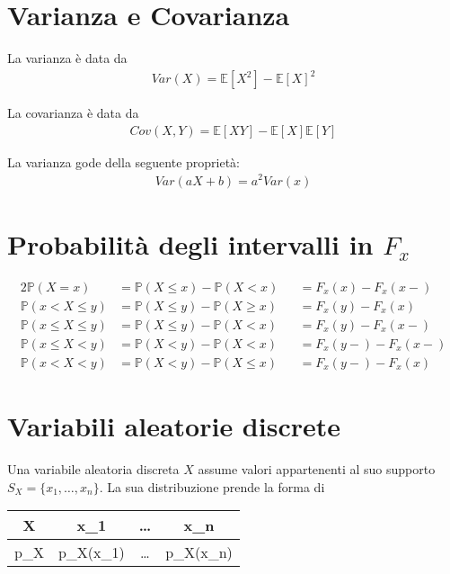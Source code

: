 \documentclass{article}
\begin{document}
\section{Varianza e Covarianza}

La varianza \`e data da
\begin{align*}
Var(X) = \mathbb{E}[X^2] - \mathbb{E}[X]^2
\end{align*}

La covarianza \`e data da
\begin{align*}
Cov(X, Y) = \mathbb{E}[XY] - \mathbb{E}[X]\mathbb{E}[Y]
\end{align*}

La varianza gode della seguente propriet\`a:
\begin{align*}
Var(aX+b) = a^2 Var(x)
\end{align*}

\section{Probabilit\`a degli intervalli in $F_x$}

\begin{alignat*}{2}
\mathbb{P}(X = x) &= \mathbb{P}(X \leq x) - \mathbb{P}(X < x) &&= F_x(x) - F_x(x-) \\
\mathbb{P}(x < X \leq y) &= \mathbb{P}(X \leq y) - \mathbb{P}(X \geq x) &&= F_x(y) - F_x(x) \\
\mathbb{P}(x \leq X \leq y) &= \mathbb{P}(X \leq y) - \mathbb{P}(X < x) &&= F_x(y) - F_x(x-) \\
\mathbb{P}(x \leq X < y) &= \mathbb{P}(X < y) - \mathbb{P}(X < x) &&= F_x(y-) - F_x(x-) \\
\mathbb{P}(x < X < y) &= \mathbb{P}(X < y) - \mathbb{P}(X \leq x) &&= F_x(y-) - F_x(x)
\end{alignat*}

\section{Variabili aleatorie discrete}

Una variabile aleatoria discreta $X$ assume valori appartenenti al suo supporto $S_X = \{x_1, \ldots, x_n\}$.
La sua distribuzione prende la forma di
\begin{center}
\begin{tabular}{ c|c|c|c } 
 X & x_1 & \ldots & x_n \\ 
 \hline
 p_X & p_X(x_1) & \ldots & p_X(x_n)
\end{tabular}
\end{center}
\end{document}
